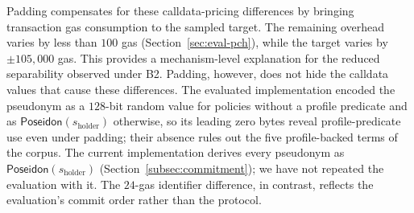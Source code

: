 Padding compensates for these calldata-pricing differences by bringing transaction gas consumption to the sampled target.
The remaining overhead varies by less than $100$ gas (Section~\ref{sec:eval-pch}), while the target varies by $\pm 105{,}000$ gas.
This provides a mechanism-level explanation for the reduced separability observed under B2.
Padding, however, does not hide the calldata values that cause these differences.
The evaluated implementation encoded the pseudonym as a $128$-bit random value for policies without a profile predicate and as $\mathsf{Poseidon}(s_{\mathrm{holder}})$ otherwise, so its leading zero bytes reveal profile-predicate use even under padding; their absence rules out the five profile-backed terms of the corpus.
The current implementation derives every pseudonym as $\mathsf{Poseidon}(s_{\mathrm{holder}})$ (Section~\ref{subsec:commitment}); we have not repeated the evaluation with it.
The $24$-gas identifier difference, in contrast, reflects the evaluation's commit order rather than the protocol.

